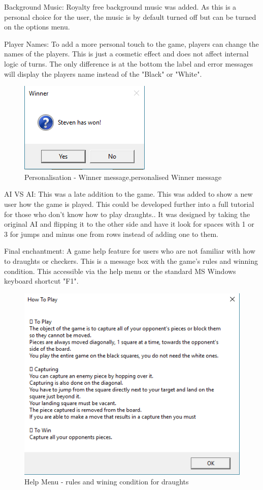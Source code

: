 \documentclass[10pt, a4paper]{article}
\begin{document}
Background Music: Royalty free background music was added. As this is a personal choice for the user, the music is by default turned off but can be turned on the options menu.

Player Names: To add a more personal touch to the game, players can change the names of the players. This is just a cosmetic effect and does not affect internal logic of turns. The only difference is at the bottom the label and error messages will display the players name instead of the "Black" or "White".

\begin{figure}[H]
  	\centering
  	\includegraphics[scale = 0.75]{Winner}
	\caption{Personalisation  - Winner message,personalised Winner message}
  	\label{fig:nonfloat}
	\end{figure}

AI VS AI: This was a late addition to the game. This was added to show a new user how the game is played. This could be developed further into a full tutorial for those who don't know how to play draughts.. It was designed by taking the original AI and flipping it to the other side and have it look for spaces with 1 or 3 for jumps and minus one from rows instead of adding one to them. 

Final enchantment: A game help feature for users who are not familiar with how to draughts or checkers. This is a message box with the game's rules and winning condition. This accessible via the help menu or the standard MS Windows keyboard shortcut "F1".

\begin{figure}[H]
  	\centering
  	\includegraphics[scale = 0.6]{Help}
	\caption{Help Menu  - rules and wining condition for draughts}
  	\label{fig:nonfloat}
	\end{figure}
\end{document}
